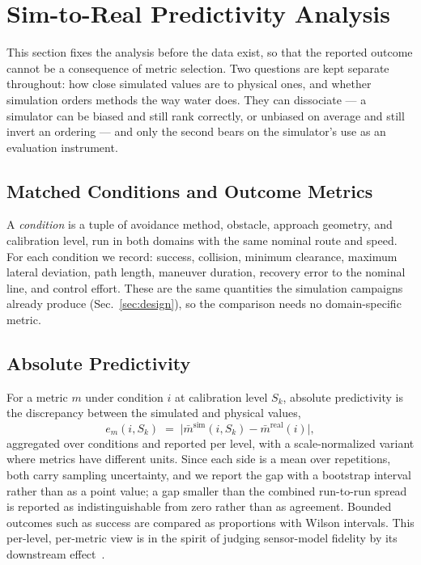 \section{Sim-to-Real Predictivity Analysis}
\label{sec:predictivity}

This section fixes the analysis before the data exist, so that the reported
outcome cannot be a consequence of metric selection. Two questions are kept
separate throughout: how close simulated values are to physical ones, and
whether simulation orders methods the way water does. They can dissociate ---
a simulator can be biased and still rank correctly, or unbiased on average
and still invert an ordering --- and only the second bears on the simulator's
use as an evaluation instrument.

\subsection{Matched Conditions and Outcome Metrics}

A \emph{condition} is a tuple of avoidance method, obstacle, approach
geometry, and calibration level, run in both domains with the same nominal
route and speed. For each condition we record: success, collision, minimum
clearance, maximum lateral deviation, path length, maneuver duration,
recovery error to the nominal line, and control effort. These are the same
quantities the simulation campaigns already produce
(Sec.~\ref{sec:design}), so the comparison needs no domain-specific metric.

\subsection{Absolute Predictivity}

For a metric $m$ under condition $i$ at calibration level $S_k$, absolute
predictivity is the discrepancy between the simulated and physical values,
\begin{equation}
  e_{m}(i, S_k) \;=\; \bigl| \bar{m}^{\mathrm{sim}}(i, S_k)
                     - \bar{m}^{\mathrm{real}}(i) \bigr| ,
  \label{eq:abserr}
\end{equation}
aggregated over conditions and reported per level, with a scale-normalized
variant where metrics have different units. Since each side is a mean over
repetitions, both carry sampling uncertainty, and we report the gap with a
bootstrap interval rather than as a point value; a gap smaller than the
combined run-to-run spread is reported as indistinguishable from zero rather
than as agreement. Bounded outcomes such as success are compared as
proportions with Wilson intervals. This per-level, per-metric view is in the
spirit of judging sensor-model fidelity by its downstream
effect~\cite{mahajan2024quantify}.

